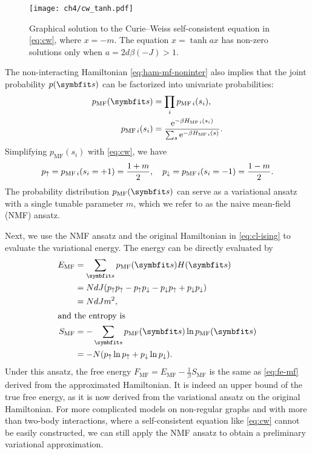 \begin{figure}[htb]
\centering
\texttt{[image: ch4/cw\_tanh.pdf]}
\caption[Graphical solution to Curie--Weiss self-consistent equation]{
Graphical solution to the Curie--Weiss self-consistent equation in \cref{eq:cw}, where $x = -m$. The equation $x = \tanh a x$ has non-zero solutions only when $a = 2 d \beta (-J) > 1$.
}
\label{fig:cw-tanh}
\end{figure}

The non-interacting Hamiltonian \cref{eq:ham-mf-noninter} also implies that the joint probability $p(\vs)$ can be factorized into univariate probabilities:
\begin{align}
p_\text{MF}(\vs) &= \prod_i p_{\text{MF}\,i}(s_i), \\
p_{\text{MF}\,i}(s_i) &= \frac{\rme^{-\beta H_{\text{MF}\,i}(s_i)}}{\sum_s \rme^{-\beta H_{\text{MF}\,i}(s)}}.
\end{align}
Simplifying $p_\text{MF}(s_i)$ with \cref{eq:cw}, we have
\begin{equation}
p_{\uparrow} = p_{\text{MF}\,i}(s_i = +1) = \frac{1 + m}{2}, \quad
p_{\downarrow} = p_{\text{MF}\,i}(s_i = -1) = \frac{1 - m}{2}.
\label{eq:p-mf}
\end{equation}
The probability distribution $p_\text{MF}(\vs)$ can serve as a variational ansatz with a single tunable parameter $m$, which we refer to as the naive mean-field (NMF) ansatz.

Next, we use the NMF ansatz and the original Hamiltonian in \cref{eq:cl-ising} to evaluate the variational energy. The energy can be directly evaluated by
\begin{align}
E_\text{MF} &= \sum_\vs p_\text{MF}(\vs) H(\vs) \\
&= N d J (p_\spinup p_\spinup - p_\spinup p_\spindown - p_\spindown p_\spinup + p_\spindown p_\spindown) \\
&= N d J m^2, \\
\shortintertext{and the entropy is}
S_\text{MF} &= -\sum_\vs p_\text{MF}(\vs) \ln p_\text{MF}(\vs) \\
&= -N (p_\spinup \ln p_\spinup + p_\spindown \ln p_\spindown).
\end{align}
Under this ansatz, the free energy $F_\text{MF} = E_\text{MF} - \frac{1}{\beta} S_\text{MF}$ is the same as \cref{eq:fe-mf} derived from the approximated Hamiltonian. It is indeed an upper bound of the true free energy, as it is now derived from the variational ansatz on the original Hamiltonian. For more complicated models on non-regular graphs and with more than two-body interactions, where a self-consistent equation like \cref{eq:cw} cannot be easily constructed, we can still apply the NMF ansatz to obtain a preliminary variational approximation.

